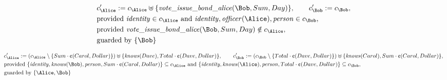 \begin{align*}
&
c'_
{
\Alice
}
 := 
c_
{
\Alice
}
 \uplus 
\{
\mathit{\detokenize{
vote_issue_bond_alice
}}
(
\Bob
,
Sum
,
Day
)
\}
, \qquad 
c'_
{
\Bob
}
 := 
c_
{
\Bob
}
,\\
&
\text{provided } 
\mathit{\detokenize{
identity
}}
 \in c_
{
\Alice
}
 \text{ and } 
\mathit{\detokenize{
identity
}}
,
\mathit{\detokenize{
officer
}}
(
\Alice
)
,
\mathit{\detokenize{
person
}}
 \in c_
{
\Bob
}
,\\
&
\text{provided } 
\mathit{\detokenize{
vote_issue_bond_alice
}}
(
\Bob
,
Sum
,
Day
)
 \notin c_
{
\Alice
}
,\\
&
\text{guarded by } \{
\Bob
\}
\end{align*}

\begin{align*}
&
c'_
{
\Alice
}
 := 
(c_
{
\Alice
}
 \setminus 
\{
Sum
\cdot
\text{\textcent}
(
Carol
,
Dollar
)
\}
) \uplus 
\{
\mathit{\detokenize{
knows
}}
(
Dave
)
,
Total
\cdot
\text{\textcent}
(
Dave
,
Dollar
)
\}
, \qquad 
c'_
{
\Bob
}
 := 
(c_
{
\Bob
}
 \setminus 
\{
Total
\cdot
\text{\textcent}
(
Dave
,
Dollar
)
\}
) \uplus 
\{
\mathit{\detokenize{
knows
}}
(
Carol
)
,
Sum
\cdot
\text{\textcent}
(
Carol
,
Dollar
)
\}
,\\
&
\text{provided } 
\{
\mathit{\detokenize{
identity
}}
,
\mathit{\detokenize{
knows
}}
(
\Bob
)
,
\mathit{\detokenize{
person
}}
,
Sum
\cdot
\text{\textcent}
(
Carol
,
Dollar
)
\}
 \subseteq c_
{
\Alice
}
 \text{ and } 
\{
\mathit{\detokenize{
identity
}}
,
\mathit{\detokenize{
knows
}}
(
\Alice
)
,
\mathit{\detokenize{
person
}}
,
Total
\cdot
\text{\textcent}
(
Dave
,
Dollar
)
\}
 \subseteq c_
{
\Bob
}
,\\
&
\text{guarded by } \{
\Alice
,
\Bob
\}
\end{align*}


